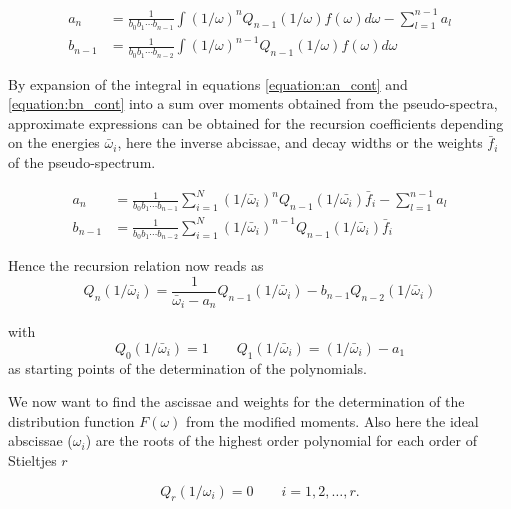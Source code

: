 \begin{align}
  a_n     &= \frac{1}{b_0b_1\cdots b_{n-1}}
             \int (1/\omega)^n Q_{n-1}(1/\omega) f(\omega) d\omega
             - \sum\limits_{l=1}^{n-1} a_l  \label{equation:an_cont}\\
  b_{n-1} &= \frac{1}{b_0b_1\cdots b_{n-2}}
             \int (1/\omega)^{n-1} Q_{n-1}(1/\omega) f(\omega) d\omega \label{equation:bn_cont}
\end{align}

By expansion of the integral in equations \ref{equation:an_cont} and
\ref{equation:bn_cont} into a sum over moments obtained from the pseudo-spectra,
approximate expressions can be obtained for the recursion coefficients
depending on the energies $\bar{\omega}_i$, here the inverse abcissae,
and decay widths or the weights $\bar{f}_i$ of the
pseudo-spectrum.

\begin{align}
  a_n     &= \frac{1}{b_0b_1\cdots b_{n-1}}
             \sum\limits_{i=1}^N
               (1/\bar{\omega}_i)^n Q_{n-1}(1/\bar{\omega_i}) \bar{f}_i
             - \sum\limits_{l=1}^{n-1} a_l \label{equation:an_disc}\\
  b_{n-1} &= \frac{1}{b_0b_1\cdots b_{n-2}}
             \sum\limits_{i=1}^N
               (1/\bar{\omega}_i)^{n-1} Q_{n-1}(1/\bar{\omega}_i) \bar{f}_i
\end{align}

Hence the recursion relation now reads as
\begin{equation}
  Q_n(1/\bar{\omega}_i) = \frac{1}{\bar{\omega}_i - a_n} Q_{n-1}(1/\bar{\omega}_i)
                          - b_{n-1} Q_{n-2}(1/\bar{\omega}_i)
\end{equation}

with
\begin{equation}
  Q_0(1/\bar{\omega}_i) = 1 \quad\quad Q_1(1/\bar{\omega}_i) = (1/\bar{\omega}_i) - a_1
\end{equation}
as starting points of the determination of the polynomials.

We now want to find the ascissae and weights for the determination of the
distribution function $F(\omega)$ from the modified moments.
Also here the ideal abscissae ($\omega_i$) are the roots of the
highest order polynomial
for each order of Stieltjes $r$

\begin{equation}
  Q_r(1/\omega_i) = 0 \quad\quad i = 1,2,\dots ,r .
\end{equation}

